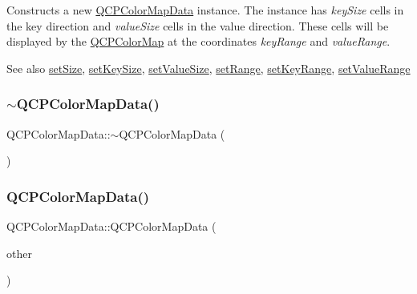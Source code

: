 Constructs a new \mbox{\hyperlink{class_q_c_p_color_map_data}{Q\+C\+P\+Color\+Map\+Data}} instance. The instance has {\itshape key\+Size} cells in the key direction and {\itshape value\+Size} cells in the value direction. These cells will be displayed by the \mbox{\hyperlink{class_q_c_p_color_map}{Q\+C\+P\+Color\+Map}} at the coordinates {\itshape key\+Range} and {\itshape value\+Range}.

\begin{DoxySeeAlso}{See also}
\mbox{\hyperlink{class_q_c_p_color_map_data_a0d9ff35c299d0478b682bfbcdd9c097e}{set\+Size}}, \mbox{\hyperlink{class_q_c_p_color_map_data_ac7ef70e383aface34b44dbde49234b6b}{set\+Key\+Size}}, \mbox{\hyperlink{class_q_c_p_color_map_data_a0893c9e3914513048b45e3429ffd16f2}{set\+Value\+Size}}, \mbox{\hyperlink{class_q_c_p_color_map_data_aad9c1c7c703c1339489fc730517c83d4}{set\+Range}}, \mbox{\hyperlink{class_q_c_p_color_map_data_a0738c485f3c9df9ea1241b7a8bb6a86e}{set\+Key\+Range}}, \mbox{\hyperlink{class_q_c_p_color_map_data_ada1b2680ba96a5f4175b6d341cf75d23}{set\+Value\+Range}} 
\end{DoxySeeAlso}
\mbox{\label{class_q_c_p_color_map_data_a7ac252031d0921520d5bccb6bfa23a8b}} 
\subsubsection{\texorpdfstring{$\sim$QCPColorMapData()}{~QCPColorMapData()}}
{\footnotesize\ttfamily Q\+C\+P\+Color\+Map\+Data\+::$\sim$\+Q\+C\+P\+Color\+Map\+Data (\begin{DoxyParamCaption}{ }\end{DoxyParamCaption})}

\mbox{\label{class_q_c_p_color_map_data_a7f2145d86473263494abb9bf1de20436}} 
\subsubsection{\texorpdfstring{QCPColorMapData()}{QCPColorMapData()}\hspace{0.1cm}{\footnotesize\ttfamily [2/2]}}
{\footnotesize\ttfamily Q\+C\+P\+Color\+Map\+Data\+::\+Q\+C\+P\+Color\+Map\+Data (\begin{DoxyParamCaption}\item[{const \mbox{\hyperlink{class_q_c_p_color_map_data}{Q\+C\+P\+Color\+Map\+Data}} \&}]{other }\end{DoxyParamCaption})}

